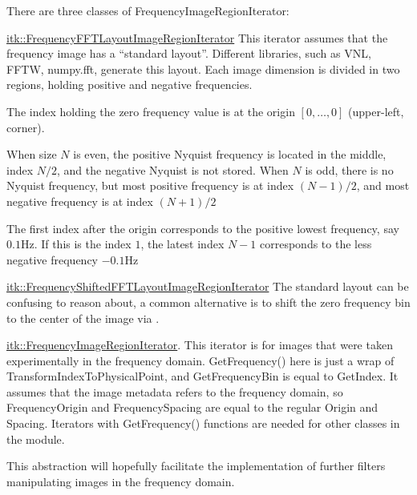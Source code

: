 \documentclass{InsightArticle}
\newcommand{\github}[1]{\href{https://github.com/phcerdan/ITKIsotropicWavelets/blob/master/include/itk#1.h}{itk::#1}}
\theoremstyle{definition}
\begin{document}
There are three classes of FrequencyImageRegionIterator:
\begin{description}[topsep=0pt,font=\normalfont\textbullet\space]
  \item [FFTLayout:] \github{FrequencyFFTLayoutImageRegionIterator}\newline
    This iterator assumes that the frequency image has a ``standard layout''. Different libraries, such as VNL, FFTW, numpy.fft, generate this layout. Each image dimension is divided in two regions, holding positive and negative frequencies.
    \begin{description}[topsep=0pt,font=\normalfont-\space]
      \item[ZeroFrequency:] The index holding the zero frequency value is at the origin $[0,\ldots,0]$ (upper-left, corner).
      \item[Nyquist:] When size $N$ is even, the positive Nyquist frequency is located in the middle, index $N/2$, and the negative Nyquist is not stored.
    When $N$ is odd, there is no Nyquist frequency, but most positive frequency is at index $(N-1)/2$, and most negative frequency is at index $(N+1)/2$
    \end{description}
    The first index after the origin corresponds to the positive lowest frequency, say $0.1 \text{Hz}$. If this is the index $1$, the latest index $N-1$ corresponds to the less negative frequency $-0.1 \text{Hz}$

  \item [ShiftedFFTLayout:] \github{FrequencyShiftedFFTLayoutImageRegionIterator}\newline
    The standard layout can be confusing to reason about, a common alternative is to shift the zero frequency bin to the center of the image via .
  \item [Regular:] \github{FrequencyImageRegionIterator}.\newline
    This iterator is for images that were taken experimentally in the frequency domain. GetFrequency() here is just a wrap of TransformIndexToPhysicalPoint, and GetFrequencyBin is equal to GetIndex. It assumes that the image metadata refers to the frequency domain, so FrequencyOrigin and FrequencySpacing are equal to the regular Origin and Spacing.
    Iterators with GetFrequency() functions are needed for other classes in the module.
\end{description}

This abstraction will hopefully facilitate the implementation of further filters manipulating images in the frequency domain.
\end{document}
